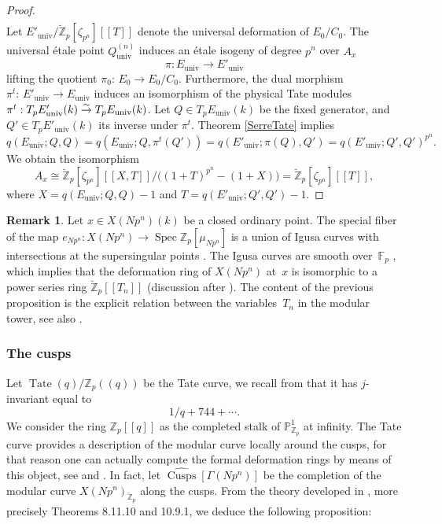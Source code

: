\documentclass[JEP,XML,SOM,Unicode,published]{cedram}
\newcommand\To[1]{\mathchoice{\xrightarrow{\textstyle\kern4pt#1\kern3pt}}{\stackrel{#1}{\to}}{}{}}
\newcommand{\lcr}{[\![}
\newcommand{\rcr}{]\!]}
\newcommand{\lpr}{(\!(}
\newcommand{\rpr}{)\!)}
\newcommand{\univ}{\mathrm{univ}}
\numberwithin{equation}{section}
\theoremstyle{definition}
\newtheorem{remark}[prop]{Remark}
\newcommand{\bb}[1]{\mathbb{#1}}
\DeclareMathOperator{\Spec}{Spec}
\DeclareMathOperator{\Cusps}{Cusps}
\DeclareMathOperator{\Tate}{Tate}
\newcommand{\mc}[1]{X(Np^{#1})}
\begin{document}
\begin{proof}
\begin{multline*}
\end{multline*}
Let $E'_{\univ}/\breve{\bb{Z}}_p[\zeta_{p^n}]\lcr T\rcr$ denote the universal deformation of $E_0/C_0$. The universal étale point $Q_{\univ}^{(n)}$ induces an étale isogeny of degree $p^n$ over $A_{x}$
\[
\pi: E_{\univ}\to E'_{\univ}
\]
lifting the quotient $\pi_0{:}\,E_0\!\to\!E_0/C_0$. Furthermore, the dual morphism \hbox{$\pi^t{:}\,E'_{\univ}\!\to\!E_{\univ}$} induces an isomorphism of the physical Tate modules $\pi^{t}: T_pE'_{\univ}(k)\To{\sim} T_p E_{\univ}(k)$. Let $Q\in T_{p} E_{\univ}(k)$ be the fixed generator, and $Q'\in T_{p} E'_{\univ}(k)$ its inverse under $\pi^t$. Theorem \ref{SerreTate} implies
\[
q(E_{\univ}; Q,Q)=q(E_{\univ}; Q,\pi^{t}(Q'))=q(E'_{\univ};\pi(Q), Q')=q(E'_{\univ};Q',Q')^{p^n}.
\]
We obtain the isomorphism
\[
A_{x}\cong \breve{\bb{Z}}_p[\zeta_{p^n}]\lcr X, T\rcr/\bigl((1+T)^{p^n}-(1+X)\bigr)=\breve{\bb{Z}}_p[\zeta_{p^n}]\lcr T\rcr,
\]
where $X=q(E_{\univ};Q,Q)-1$ and $T=q(E'_{\univ}; Q',Q')-1$.
\end{proof}

\begin{remark}
Let $x\in X(Np^n)(k)$ be a closed ordinary point. The special fiber of the map $e_{Np^n}: X(Np^n)\to \Spec \bb{Z}_p[\mu_{Np^n}]$ is a union of Igusa curves with intersections at the supersingular points \cite[Th.\,13.10.3]{katz1985arithmetic}. The Igusa curves are smooth over~$\bb{F}_p$ \cite[Th.\,12.6.1]{katz1985arithmetic}, which implies that the deformation ring of $X(Np^n)$ at~$x$ is isomorphic to a power series ring $\breve{\bb{Z}}_p\lcr T_n\rcr$ (\cf discussion after \cite[Rem.\,3.4.4]{WeinsteinModinfinite}). The content of the previous proposition is the explicit relation between the variables~$T_n$ in the modular tower, see also \cite[Prop.\,2.2]{JacobFullLevel2019}.
\end{remark}

\subsubsection*{The cusps}

Let $\Tate(q)/\bb{Z}_p\lpr q\rpr$ be the Tate curve, we recall from \!\cite[Ch.\,8.8]{katz1985arithmetic} that it has $j$-invariant equal to
\[1/q+744+\cdots.\]
We consider the ring $\bb{Z}_p\lcr q\rcr$ as the completed stalk of $\bb{P}^1_{\bb{Z}_p}$ at infinity. The Tate curve provides a description of the modular curve locally around the cusps, for that reason one can actually compute the formal deformation rings by means of this object, see \cite{katz1985arithmetic} and \cite{deligne1973schemas}. In fact, let $\widehat{\Cusps}[\Gamma(Np^n)]$ be the completion of the modular curve $\mc{n}_{\breve{\bb{Z}}_p}$ along the cusps. From the theory developed in \cite[Ch.\,8\,\&\,10]{katz1985arithmetic}, more precisely Theorems 8.11.10 and 10.9.1, we deduce the following proposition:
\end{document}
